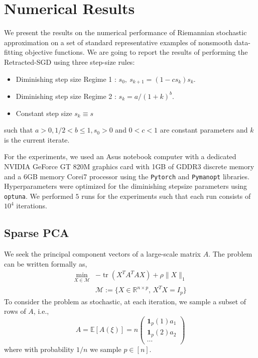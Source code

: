 \documentclass{article}
\begin{document}
\section{Numerical Results}



We present the results on the numerical performance of Riemannian stochastic approximation on a set of standard representative examples of nonsmooth data-fitting objective functions. We are going to report the results of performing the Retracted-SGD using three step-size rules: 
\begin{itemize}
    \item Diminishing step size Regime 1 : $s_0,~s_{k+1}=(1-cs_k)s_k$.
    \item Diminishing step size Regime 2 : $s_k=a/(1+k)^b$.
    \item Constant step size $s_k\equiv s$
\end{itemize}  
such that $a>0,1/2<b\le 1, s_0>0$ and $0<c<1$ are constant parameters and $k$ is the current iterate. 

For the experiments, we used an Asus notebook computer with a dedicated NVIDIA GeForce GT 820M graphics card with 1GB of GDDR3 discrete memory and a 6GB memory Corei7 processor using the \texttt{Pytorch} and \texttt{Pymanopt} libraries. Hyperparameters were optimized for the diminishing stepsize parameters using \texttt{optuna}. We performed $5$ runs for the experiments such that each run consists of $10^4$ iterations. 


\subsection{Sparse PCA}
We seek the principal component vectors of a large-scale matrix $A$. The problem can be written formally as,
\begin{equation}\label{eq:sparsepca}
\begin{array}{rl} 
\min\limits_{X\in\mathcal{M}} & -\mathop{tr}(X^TA^T A X)+\rho \|X\|_1\\
& \mathcal{M}:=\{ X\in\mathbb{R}^{n\times p},\, X^T X = I_p\}
\end{array}
\end{equation}
To consider the problem as stochastic, at each iteration, we sample a subset of rows of $A$, i.e., 
\[
A = \mathbb{E}[A(\xi)]= n \begin{pmatrix} \mathbf{1}_{p}(1)a_1 \\ \mathbf{1}_{p}(2) a_2 \\ \cdots \end{pmatrix} 
\]
where with probability $1/n$ we sample $p\in [n]$.
\end{document}
